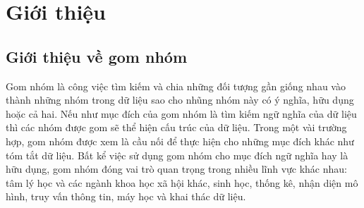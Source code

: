 \chapter{Giới thiệu}
\label{Chapter1}

\section{Giới thiệu về gom nhóm}

Gom nhóm là công việc tìm kiếm và chia những đối tượng gần giống nhau vào thành những nhóm trong dữ liệu sao cho nhũng nhóm này có ý nghĩa, hữu dụng hoặc cả hai. %
Nếu như mục đích của gom nhóm là tìm kiếm ngữ nghĩa của dữ liệu thì các nhóm được gom sẽ thể hiện cấu trúc của dữ liệu.
Trong một vài trường hợp, gom nhóm được xem là cầu nối để thực hiện cho những mục đích khác như tóm tắt dữ liệu.
Bất kể việc sử dụng gom nhóm cho mục đích ngữ nghĩa hay là hữu dụng, gom nhóm đóng vai trò quan trọng trong nhiều lĩnh vực khác nhau: tâm lý học và các ngành khoa học xã hội khác, sinh học, thống kê, nhận diện mô hình, truy vấn thông tin, máy học và khai thác dữ liệu.

